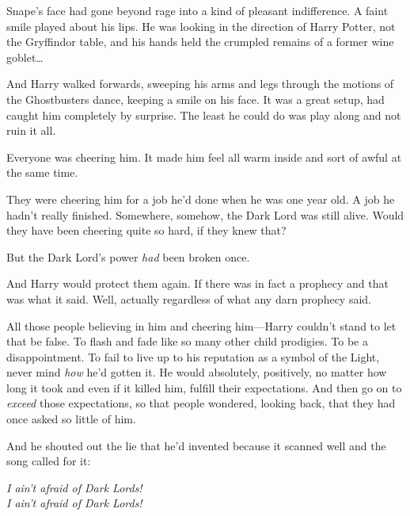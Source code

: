 Snape's face had gone beyond rage into a kind of pleasant indifference. A faint 
smile played about his lips. He was looking in the direction of Harry Potter, 
not the Gryffindor table, and his hands held the crumpled remains of a former 
wine goblet{\ldots}

And Harry walked forwards, sweeping his arms and legs through the motions of 
the Ghostbusters dance, keeping a smile on his face. It was a great setup, had 
caught him completely by surprise. The least he could do was play along and not 
ruin it all.

Everyone was cheering him. It made him feel all warm inside and sort of awful 
at the same time.

They were cheering him for a job he'd done when he was one year old. A job he 
hadn't really finished. Somewhere, somehow, the Dark Lord was still alive. 
Would they have been cheering quite so hard, if they knew that?

But the Dark Lord's power \emph{had} been broken once.

And Harry would protect them again. If there was in fact a prophecy and that 
was what it said. Well, actually regardless of what any darn prophecy said.

All those people believing in him and cheering him---Harry couldn't stand to 
let that be false. To flash and fade like so many other child prodigies. To be 
a disappointment. To fail to live up to his reputation as a symbol of the 
Light, never mind \emph{how} he'd gotten it. He would absolutely, positively, 
no matter how long it took and even if it killed him, fulfill their 
expectations. And then go on to \emph{exceed} those expectations, so that 
people wondered, looking back, that they had once asked so little of him.

And he shouted out the lie that he'd invented because it scanned well and the 
song called for it:

\begin{center}
\emph{I ain't afraid of Dark Lords!\\
I ain't afraid of Dark Lords!}
\end{center}

